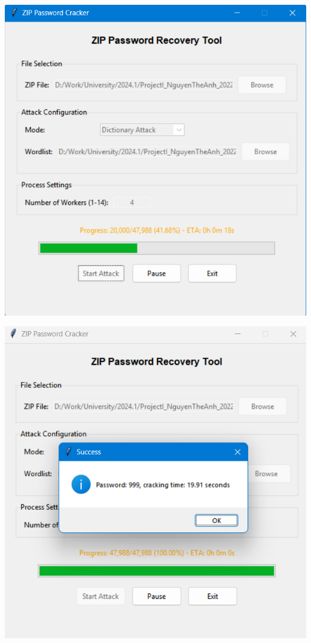 \documentclass[../DoAn.tex]{subfiles}
\begin{document}
\begin{minipage}[t]{0.45\textwidth}
    \centering
    \includegraphics[width=\textwidth]{Hinhanh/Running.png} %
\end{minipage}
\hfill %
\begin{minipage}[t]{0.45\textwidth}
    \centering
    \includegraphics[width=\textwidth]{Hinhanh/Successful.png} %
\end{minipage}
\end{document}
